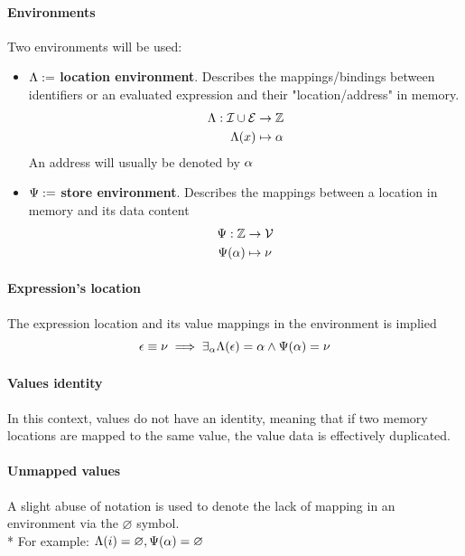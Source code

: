 \paragraph{Environments} Two environments will be used:
\begin{itemize}
	\item $\Lambda :=$ \textbf{location environment}. Describes the
		mappings/bindings between identifiers or an evaluated expression and
		their "location/address" in memory.
		\[
			\begin{split}
				\Lambda: \mathcal{I} \cup \mathcal{E} & \to \mathbb{Z}\\*
				\Lambda(x) & \mapsto \alpha
			\end{split}
		\]
		An address will usually be denoted by $\alpha$
	\item $\Psi :=$ \textbf{store environment}. Describes the mappings
		between a location in memory and its data content
		\[
			\begin{split}
				\Psi : \mathbb{Z} & \to \mathcal{V} \\*
				\Psi(\alpha) & \mapsto \nu
			\end{split}
		\]
\end{itemize}


\paragraph{Expression's location} The expression location and its value
mappings in the environment is implied
\[
	\epsilon\equiv\nu
	\implies \exists_\alpha{\Lambda(\epsilon)=\alpha\land \Psi(\alpha)=\nu}
\]

\paragraph{Values identity} In this context, values do not have an identity,
meaning that if two memory locations are mapped to the same value, the value
data is effectively duplicated.

\paragraph{Unmapped values} A slight abuse of notation is used to denote the
lack of mapping in an environment via the $\varnothing$ symbol.\\*
For example: $\Lambda(i) = \varnothing, \Psi(\alpha) = \varnothing$

